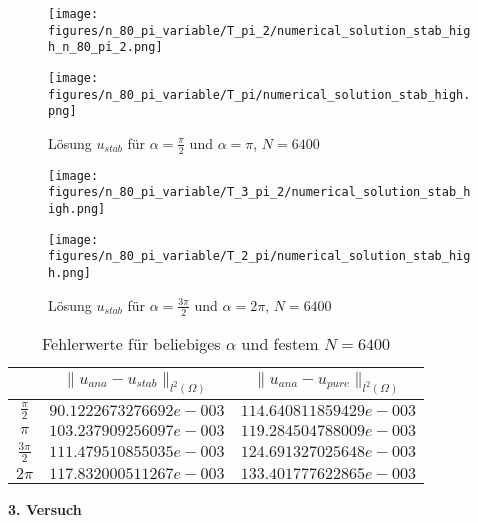 \documentclass[12pt,titlepage]{article}
\begin{document}
\begin{figure}[H]
\hspace{0.1cm}
\begin{minipage}{0.4\textwidth}
\texttt{[image: figures/n\_80\_pi\_variable/T\_pi\_2/numerical\_solution\_stab\_high\_n\_80\_pi\_2.png]}
\end{minipage}
\hspace{1.4cm}
\begin{minipage}{0.4\textwidth}
\texttt{[image: figures/n\_80\_pi\_variable/T\_pi/numerical\_solution\_stab\_high.png]}
\end{minipage}
\caption{Lösung $u_{stab}$ für $\alpha=\frac{\pi}{2}$ und $\alpha=\pi$, $N=6400$}
\label{fig:stab_80_pi}
\end{figure}
\begin{figure}[H]
\hspace{0.1cm}
\begin{minipage}{0.4\textwidth}
\texttt{[image: figures/n\_80\_pi\_variable/T\_3\_pi\_2/numerical\_solution\_stab\_high.png]}
\end{minipage}
\hspace{1.4cm}
\begin{minipage}{0.4\textwidth}
\texttt{[image: figures/n\_80\_pi\_variable/T\_2\_pi/numerical\_solution\_stab\_high.png]}
\end{minipage}
\caption{Lösung $u_{stab}$ für $\alpha=\frac{3\pi}{2}$ und $\alpha=2\pi$, $N=6400$}
\label{fig:stab_80_2pi}
\end{figure}
\noindent
\begin{table}[H]
\centering
\begin{tabular}[\textwidth]{|c|c|c|}
\hline
  & $\|u_{ana}-u_{stab}\|_{l^2(\Omega)}$ & $\|u_{ana}-u_{pure}\|_{l^2(\Omega)}$\\
\hline
$\frac{\pi}{2}$ & $90.1222673276692e-003$ & $114.640811859429e-003$\\
$\pi$ & $103.237909256097e-003$ & $119.284504788009e-003$\\
\hline
$\frac{3\pi}{2}$ & $111.479510855035e-003$ & $124.691327025648e-003$\\
$2\pi$ & $117.832000511267e-003$ & $133.401777622865e-003$\\
\hline
\end{tabular}
\caption{Fehlerwerte für beliebiges $\alpha$ und festem $N=6400$}
\label{tab:fehler_N_rotation}
\end{table}
\noindent
\textbf{3. Versuch}\\\\
\end{document}
